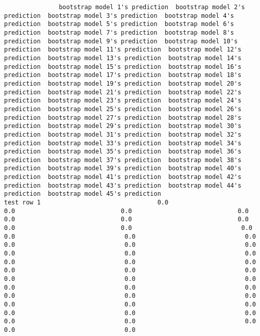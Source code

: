 \documentclass[11pt]{article}
\begin{document}
    
    
    \begin{verbatim}
               bootstrap model 1's prediction  bootstrap model 2's prediction  bootstrap model 3's prediction  bootstrap model 4's prediction  bootstrap model 5's prediction  bootstrap model 6's prediction  bootstrap model 7's prediction  bootstrap model 8's prediction  bootstrap model 9's prediction  bootstrap model 10's prediction  bootstrap model 11's prediction  bootstrap model 12's prediction  bootstrap model 13's prediction  bootstrap model 14's prediction  bootstrap model 15's prediction  bootstrap model 16's prediction  bootstrap model 17's prediction  bootstrap model 18's prediction  bootstrap model 19's prediction  bootstrap model 20's prediction  bootstrap model 21's prediction  bootstrap model 22's prediction  bootstrap model 23's prediction  bootstrap model 24's prediction  bootstrap model 25's prediction  bootstrap model 26's prediction  bootstrap model 27's prediction  bootstrap model 28's prediction  bootstrap model 29's prediction  bootstrap model 30's prediction  bootstrap model 31's prediction  bootstrap model 32's prediction  bootstrap model 33's prediction  bootstrap model 34's prediction  bootstrap model 35's prediction  bootstrap model 36's prediction  bootstrap model 37's prediction  bootstrap model 38's prediction  bootstrap model 39's prediction  bootstrap model 40's prediction  bootstrap model 41's prediction  bootstrap model 42's prediction  bootstrap model 43's prediction  bootstrap model 44's prediction  bootstrap model 45's prediction
test row 1                                0.0                             0.0                             0.0                             0.0                             0.0                             0.0                             0.0                             0.0                             0.0                              0.0                              0.0                              0.0                              0.0                              0.0                              0.0                              0.0                              0.0                              0.0                              0.0                              0.0                              0.0                              0.0                              0.0                              0.0                              0.0                              0.0                              0.0                              0.0                              0.0                              0.0                              0.0                              0.0                              0.0                              0.0                              0.0                              0.0                              0.0                              0.0                              0.0                              0.0                              0.0                              0.0                              0.0                              0.0                              0.0

\end{verbatim}
\end{document}
